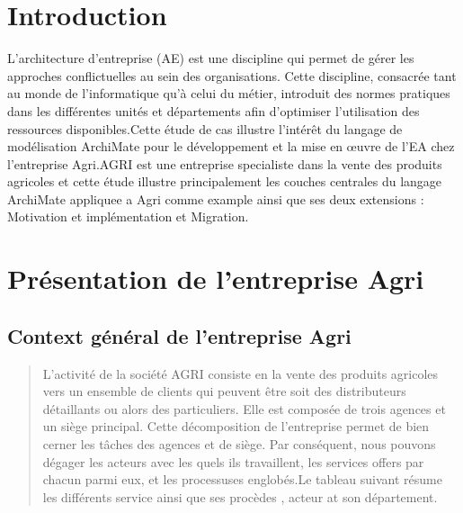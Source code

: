 \documentclass[a4paper]{report}
\begin{document}
\begin{doublespace}
  \chapter*{\centering Introduction}
L'architecture d'entreprise (AE) est une discipline qui permet de gérer
les approches conflictuelles au sein des organisations. Cette
discipline, consacrée tant au monde de l'informatique qu'à celui du
métier, introduit des normes pratiques dans les différentes unités et
départements afin d'optimiser l'utilisation des ressources
disponibles.Cette étude de cas illustre l'intérêt du langage de
modélisation ArchiMate pour le développement et la mise en œuvre de l'EA
chez l'entreprise Agri.AGRI est une entreprise specialiste dans la vente
des produits agricoles et cette étude illustre principalement les
couches centrales du langage ArchiMate appliquee a Agri comme example
ainsi que ses deux extensions : Motivation et implémentation et
Migration.

\chapter{Présentation de l'entreprise Agri}
\fancyhead[L]{\hspace*{5cm}}

\section{Context général de l'entreprise Agri}

\begin{quote}
L'activité de la société AGRI consiste en la vente des produits
agricoles vers un ensemble de clients qui peuvent être soit des
distributeurs détaillants ou alors des particuliers. Elle est composée
de trois agences et un siège principal. Cette décomposition de
l'entreprise permet de bien cerner les tâches des agences et de siège.
Par conséquent, nous pouvons dégager les acteurs avec les quels ils
travaillent, les services offers par chacun parmi eux, et les
processuses englobés.Le tableau suivant résume les différents service
ainsi que ses procèdes , acteur at son département.
\end{quote}


\end{doublespace}
\end{document}
